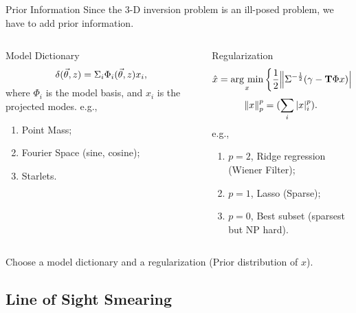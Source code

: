 \begin{frame}{Prior Information}
Since the $3$-D inversion problem is an \alert{ill-posed problem}, we have to add \alert{prior information}.
\begin{columns}[t]
\begin{column}{0.5\textwidth}
\begin{alertblock}{Model Dictionary}
\begin{equation} \notag
\delta(\vec{\theta},z)=\Sigma_{i} \Phi_i(\vec{\theta},z) x_i,
\end{equation}
where $\Phi_i$ is the model basis, and $x_i$ is the projected modes.
e.g.,
\begin{enumerate}
    \item Point Mass;
    \item Fourier Space (sine, cosine);
    \item Starlets.
\end{enumerate}
\end{alertblock}
\end{column}

\begin{column}{0.5\textwidth}
\begin{alertblock}{Regularization}
\begin{equation} \notag
\hat{x}=\mathop{\rm arg~min}\limits_{x} \left\{ \frac{1}{2}\norm{\Sigma^{-\frac{1}{2}}(\gamma-
\mathbf{T} \Phi x)}_2^2+ \lambda \norm{x}_p^p \right\},
\end{equation}
\begin{equation}\notag
\norm{x}_p^p=(\sum_{i} |x|^p_i).
\end{equation}
e.g.,
\begin{enumerate}
    \item $p=2$, \alert{Ridge regression} (Wiener Filter);
    \item $p=1$, \alert{Lasso} (Sparse);
    \item $p=0$, \alert{Best subset} (sparsest but NP hard).
\end{enumerate}
\end{alertblock}
\end{column}
\end{columns}
Choose a \alert{model dictionary} and a \alert{regularization
(Prior distribution of $x$)}.
\end{frame}


\subsection{Line of Sight Smearing}

